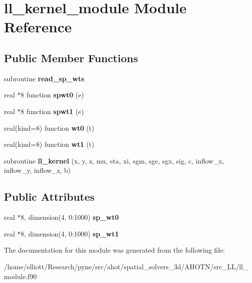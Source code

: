 \hypertarget{classll__kernel__module}{\section{ll\-\_\-kernel\-\_\-module Module Reference}
\label{classll__kernel__module}
}
\subsection*{Public Member Functions}
\begin{DoxyCompactItemize}
\item 
\hypertarget{classll__kernel__module_ae64b1d2d995c0e8c9d1014c83252100a}{subroutine {\bfseries read\-\_\-sp\-\_\-wts}}\label{classll__kernel__module_ae64b1d2d995c0e8c9d1014c83252100a}

\item 
\hypertarget{classll__kernel__module_abd3403d056c55f29237c37458c205516}{real $\ast$8 function {\bfseries spwt0} (e)}\label{classll__kernel__module_abd3403d056c55f29237c37458c205516}

\item 
\hypertarget{classll__kernel__module_a79e47a1da308cac21d2f614706b336a5}{real $\ast$8 function {\bfseries spwt1} (e)}\label{classll__kernel__module_a79e47a1da308cac21d2f614706b336a5}

\item 
\hypertarget{classll__kernel__module_a0f8329a7949f76c5316682e710a76f11}{real(kind=8) function {\bfseries wt0} (t)}\label{classll__kernel__module_a0f8329a7949f76c5316682e710a76f11}

\item 
\hypertarget{classll__kernel__module_a8e6ae1b763dd657b55e2eba5bd311e2f}{real(kind=8) function {\bfseries wt1} (t)}\label{classll__kernel__module_a8e6ae1b763dd657b55e2eba5bd311e2f}

\item 
\hypertarget{classll__kernel__module_a27d3794c74e14ccbb0297fd8ebdccdd3}{subroutine {\bfseries ll\-\_\-kernel} (x, y, z, mu, eta, xi, sgm, sge, sgx, sig, c, inflow\-\_\-x, inflow\-\_\-y, inflow\-\_\-z, b)}\label{classll__kernel__module_a27d3794c74e14ccbb0297fd8ebdccdd3}

\end{DoxyCompactItemize}
\subsection*{Public Attributes}
\begin{DoxyCompactItemize}
\item 
\hypertarget{classll__kernel__module_a4f8600d6061bd3d372282cac9efbab25}{real $\ast$8, dimension(4, 0\-:1000) {\bfseries sp\-\_\-wt0}}\label{classll__kernel__module_a4f8600d6061bd3d372282cac9efbab25}

\item 
\hypertarget{classll__kernel__module_ae9ebcee33ee11a014a911c8f1552c216}{real $\ast$8, dimension(4, 0\-:1000) {\bfseries sp\-\_\-wt1}}\label{classll__kernel__module_ae9ebcee33ee11a014a911c8f1552c216}

\end{DoxyCompactItemize}


The documentation for this module was generated from the following file\-:\begin{DoxyCompactItemize}
\item 
/home/elliott/\-Research/pyne/src/ahot/spatial\-\_\-solvers\-\_\-3d/\-A\-H\-O\-T\-N/src\-\_\-\-L\-L/ll\-\_\-module.\-f90\end{DoxyCompactItemize}
